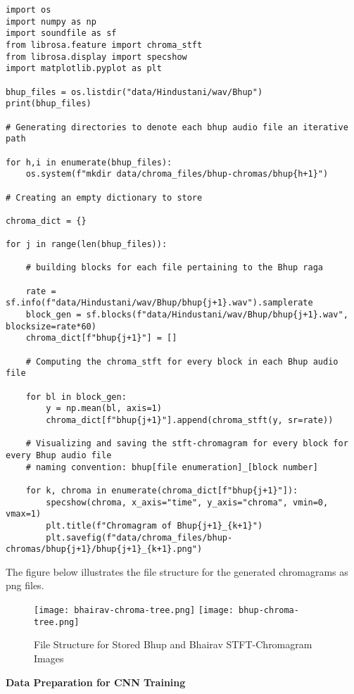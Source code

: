 \begin{lstlisting}
import os
import numpy as np
import soundfile as sf
from librosa.feature import chroma_stft
from librosa.display import specshow
import matplotlib.pyplot as plt

bhup_files = os.listdir("data/Hindustani/wav/Bhup")
print(bhup_files)

# Generating directories to denote each bhup audio file an iterative path

for h,i in enumerate(bhup_files):
    os.system(f"mkdir data/chroma_files/bhup-chromas/bhup{h+1}")

# Creating an empty dictionary to store

chroma_dict = {}

for j in range(len(bhup_files)):

    # building blocks for each file pertaining to the Bhup raga

    rate = sf.info(f"data/Hindustani/wav/Bhup/bhup{j+1}.wav").samplerate
    block_gen = sf.blocks(f"data/Hindustani/wav/Bhup/bhup{j+1}.wav", blocksize=rate*60)
    chroma_dict[f"bhup{j+1}"] = []

    # Computing the chroma_stft for every block in each Bhup audio file

    for bl in block_gen:
        y = np.mean(bl, axis=1)
        chroma_dict[f"bhup{j+1}"].append(chroma_stft(y, sr=rate))

    # Visualizing and saving the stft-chromagram for every block for every Bhup audio file
    # naming convention: bhup[file enumeration]_[block number]

    for k, chroma in enumerate(chroma_dict[f"bhup{j+1}"]):
        specshow(chroma, x_axis="time", y_axis="chroma", vmin=0, vmax=1)
        plt.title(f"Chromagram of Bhup{j+1}_{k+1}")
        plt.savefig(f"data/chroma_files/bhup-chromas/bhup{j+1}/bhup{j+1}_{k+1}.png")
\end{lstlisting}

The figure below illustrates the file structure for the generated chromagrams as png files.

\begin{figure}
  \caption{File Structure for Stored Bhup and Bhairav STFT-Chromagram Images}
  \texttt{[image: bhairav-chroma-tree.png]}
  \texttt{[image: bhup-chroma-tree.png]}
\end{figure}

\begin{flushleft}
  \textbf{Data Preparation for CNN Training}
\end{flushleft}

